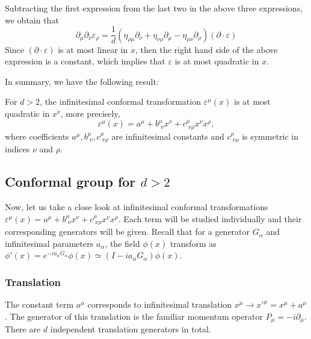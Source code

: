\documentclass[graybox,envcountchap,sectrefs]{svmono}
\begin{document}
Subtracting the first expression from the last two in the above three expressions, we obtain that
\begin{equation}\label{eq:epsilon6}
\boxed{
\partial_{\mu}\partial_{\nu}\varepsilon_{\rho}=\frac{1}{d}(\eta_{\rho\mu}\partial_{\nu}+\eta_{\nu\rho}\partial_{\mu}-\eta_{\mu\nu}\partial_{\rho})(\partial\cdot\varepsilon)
}
\end{equation}
Since $(\partial\cdot\varepsilon)$ is at most linear in $x$, then the right hand side of the above expression is a constant, which implies that $\varepsilon$ is at most quadratic in $x$.

In summary, we have the following result:
\begin{svgraybox}
\begin{proposition}
For $d>2$, the infinitesimal conformal transformation $\varepsilon^{\mu}(x)$ is at most quadratic in $x^{\nu}$, more precisely,
\begin{equation}
\varepsilon^{\mu}(x)=a^{\mu}+b^{\mu}_{\,\,\nu}x^{\nu}+c^{\mu}_{\,\,\nu\rho}x^{\nu}x^{\rho},
\end{equation}
where coefficients $a^{\mu},b^{\mu}_{\,\,\nu},c^{\mu}_{\,\,\nu\rho}$ are infinitesimal constants and $c^{\mu}_{\,\,\nu\rho}$ is symmetric in indices $\nu$ and $\rho$.
\end{proposition}
\end{svgraybox}

\subsection{Conformal group for $d>2$}
Now,  let us take a close look at infinitesimal conformal transformations $\varepsilon^{\mu}(x)=a^{\mu}+b^{\mu}_{\,\,\nu}x^{\nu}+c^{\mu}_{\,\,\nu\rho}x^{\nu}x^{\rho}$. Each term will be studied individually and their corresponding generators will be given. Recall that for a generator $G_{\alpha}$ and infinitesimal parameters $a_{\alpha}$, the field $\phi(x)$ transform as $\phi'(x)=e^{-ia_{\alpha}G_{\alpha}}\phi(x)\simeq (I-ia_{\alpha}G_{\alpha})\phi(x)$.


\subsubsection*{Translation}
The constant term $a^{\mu}$ corresponds to infinitesimal translation $x^{\mu}\to x'^{\mu}=x^{\mu}+a^{\mu}$. The generator of this translation is the familiar momentum operator $P_{\mu}=-i\partial_{\mu}$. There are $d$ independent translation generators in total.
\end{document}
